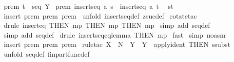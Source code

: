 \begin{isabellebody}
\ prem{}{\isacharcolon}\ {\isachardoublequoteopen}t\ {\isacharcolon}\ seq\ Y{\isachardoublequoteclose}\isanewline
{}\ prem{}{\isacharcolon}\ {\isachardoublequoteopen}insertseq\ a\ s\ {\isacharequal}\ insertseq\ a\ t{\isachardoublequoteclose}\ \isanewline
{}\ {\isachardoublequoteopen}{\isacharparenleft}s{\isacharequal}t{\isacharparenright}{\isachardoublequoteclose}\isanewline
%
\isadelimproof
%
\endisadelimproof
%
\isatagproof
{}\isamarkupfalse%
\ {\isacharparenleft}insert\ prem{}\ prem{}\ prem{}{\isacharparenright}\isanewline
{}\isamarkupfalse%
\ {\isacharparenleft}unfold\ insertseq{\isacharunderscore}def\ zsuc{\isacharunderscore}def{\isacharparenright}\isanewline
{}\isamarkupfalse%
\ {\isacharparenleft}rotate{\isacharunderscore}tac\ {\isacharminus}{}{\isacharparenright}\isanewline
{}\isamarkupfalse%
\ {\isacharparenleft}drule\ insert{\isacharunderscore}eq\ {\isacharbrackleft}THEN\ mp\ {\isacharbrackleft}THEN\ mp\ {\isacharbrackleft}THEN\ mp{\isacharbrackright}{\isacharbrackright}{\isacharbrackright}{\isacharparenright}\isanewline
{}\isamarkupfalse%
\ {\isacharparenleft}simp\ add{\isacharcolon}\ seq{\isacharunderscore}def{\isacharparenright}\isanewline
{}\isamarkupfalse%
\ {\isacharparenleft}simp\ add{\isacharcolon}\ seq{\isacharunderscore}def{\isacharparenright}\isanewline
{}\isamarkupfalse%
\ {\isacharparenleft}drule\ insertseq{\isacharunderscore}eq{\isacharunderscore}lemma\ {\isacharbrackleft}THEN\ mp{\isacharbrackright}{\isacharparenright}\isanewline
{}\isamarkupfalse%
\ fast\isanewline
{}\isamarkupfalse%
\ {\isacharparenleft}simp\ {\isacharparenleft}no{\isacharunderscore}asm{\isacharparenright}{\isacharparenright}\isanewline
{}\isamarkupfalse%
\ {\isacharparenleft}insert\ prem{}\ prem{}\ prem{}{\isacharparenright}\isanewline
{}\isamarkupfalse%
\ {\isacharparenleft}rule{\isacharunderscore}tac\ X{}\ {\isacharequal}\ {\isachardoublequoteopen}{\isacharpercent}N{\isachardoublequoteclose}\ \ Y{}\ {\isacharequal}\ {\isachardoublequoteopen}Y{\isachardoublequoteclose}\ \ apply{\isacharunderscore}ident\ {\isacharbrackleft}THEN\ ssubst{\isacharbrackright}{\isacharparenright}\isanewline
{}\isamarkupfalse%
\ {\isacharparenleft}unfold\ seq{\isacharunderscore}def\ fin{\isacharunderscore}part{\isacharunderscore}func{\isacharunderscore}def{\isacharparenright}\isanewline

\end{isabellebody}
